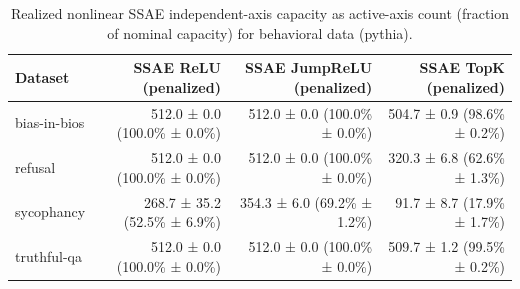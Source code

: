 \begin{table}[t]
\centering
\caption{Realized nonlinear SSAE independent-axis capacity as active-axis count (fraction of nominal capacity) for behavioral data (pythia).}
\label{tab:behavioral-pythia-realized-active-axis-capacity}
\begin{tabular}{lrrr}
\toprule
Dataset & SSAE ReLU (penalized) & SSAE JumpReLU (penalized) & SSAE TopK (penalized) \\
\midrule
bias-in-bios & 512.0 ± 0.0 (100.0\% ± 0.0\%) & 512.0 ± 0.0 (100.0\% ± 0.0\%) & 504.7 ± 0.9 (98.6\% ± 0.2\%) \\
refusal & 512.0 ± 0.0 (100.0\% ± 0.0\%) & 512.0 ± 0.0 (100.0\% ± 0.0\%) & 320.3 ± 6.8 (62.6\% ± 1.3\%) \\
sycophancy & 268.7 ± 35.2 (52.5\% ± 6.9\%) & 354.3 ± 6.0 (69.2\% ± 1.2\%) & 91.7 ± 8.7 (17.9\% ± 1.7\%) \\
truthful-qa & 512.0 ± 0.0 (100.0\% ± 0.0\%) & 512.0 ± 0.0 (100.0\% ± 0.0\%) & 509.7 ± 1.2 (99.5\% ± 0.2\%) \\
\bottomrule
\end{tabular}
\end{table}
